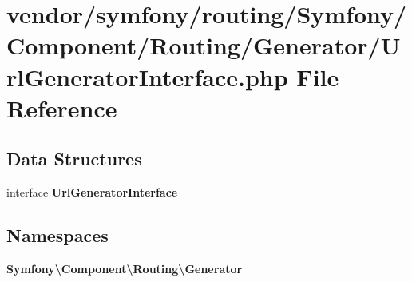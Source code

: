 \section{vendor/symfony/routing/\+Symfony/\+Component/\+Routing/\+Generator/\+Url\+Generator\+Interface.php File Reference}
\label{_url_generator_interface_8php}
\subsection*{Data Structures}
\begin{DoxyCompactItemize}
\item 
interface {\bf Url\+Generator\+Interface}
\end{DoxyCompactItemize}
\subsection*{Namespaces}
\begin{DoxyCompactItemize}
\item 
 {\bf Symfony\textbackslash{}\+Component\textbackslash{}\+Routing\textbackslash{}\+Generator}
\end{DoxyCompactItemize}
